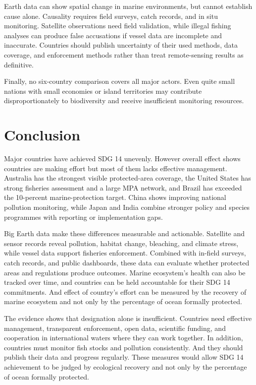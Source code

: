 \documentclass[12pt,letterpaper]{article}
\begin{document}
Earth data can show spatial change in marine environments, but cannot establish cause alone. Causality requires field surveys, catch records, and in situ monitoring. Satellite observations need field validation, while illegal fishing analyses can produce false accusations if vessel data are incomplete and inaccurate. Countries should publish uncertainty of their used methods, data coverage, and enforcement methods rather than treat remote-sensing results as definitive.

Finally, no six-country comparison covers all major actors. Even quite small nations with small economies or island territories may contribute disproportionately to biodiversity and receive insufficient monitoring resources.

\section{Conclusion}
\label{sec:conclusion}
Major countries have achieved SDG 14 unevenly. However overall effect shows countries are making effort but most of them lacks effective management. Australia has the strongest visible protected-area coverage, the United States has strong fisheries assessment and a large MPA network, and Brazil has exceeded the 10-percent marine-protection target. China shows improving national pollution monitoring, while Japan and India combine stronger policy and species programmes with reporting or implementation gaps.

Big Earth data make these differences measurable and actionable. Satellite and sensor records reveal pollution, habitat change, bleaching, and climate stress, while vessel data support fisheries enforcement. Combined with in-field surveys, catch records, and public dashboards, these data can evaluate whether protected areas and regulations produce outcomes. Marine ecosystem's health can also be tracked over time, and countries can be held accountable for their SDG 14 commitments. And effect of country's effort can be measured by the recovery of marine ecosystem and not only by the percentage of ocean formally protected.

The evidence shows that designation alone is insufficient. Countries need effective management, transparent enforcement, open data, scientific funding, and cooperation in international waters where they can work together. In addition, countries must monitor fish stocks and pollution consistently. And they should publish their data and progress regularly. These measures would allow SDG 14 achievement to be judged by ecological recovery and not only by the percentage of ocean formally protected.
\end{document}
